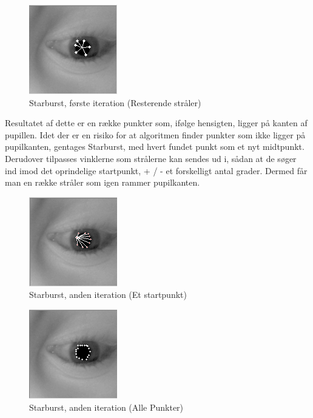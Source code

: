 \documentclass[rapport.tex]{subfiles}
\begin{document}
	\begin{figure}
	\raggedleft
	\includegraphics[width=0.4\linewidth]{Billeder/Starburst,First.png}
	\caption{Starburst, første iteration (Resterende stråler)}
	\label{fig:Starburst,First}
	\end{figure}
	
	Resultatet af dette er en række punkter som, ifølge hensigten, ligger på kanten af pupillen. Idet der er en risiko for at algoritmen finder punkter som ikke ligger på pupilkanten, gentages Starburst, med hvert fundet punkt som et nyt midtpunkt. Derudover tilpasses vinklerne som strålerne kan sendes ud i, sådan at de søger ind imod det oprindelige startpunkt, + / - et forskelligt antal grader. Dermed får man en række stråler som igen rammer pupilkanten.
	
	\begin{figure}
	\centering
	\includegraphics[width=0.4\linewidth]{Billeder/Starburst,Secondsingle.png}
	\caption{Starburst, anden iteration (Et startpunkt)}
	\label{fig:Starburst,Secondsingle}
	\end{figure}
	
	
	\begin{figure}
	\centering
	\includegraphics[width=0.4\linewidth]{Billeder/Starburst,Second.png}
	\caption{Starburst, anden iteration (Alle Punkter)}
	\label{fig:Starburst,Second}
	\end{figure}
		
\end{document}
